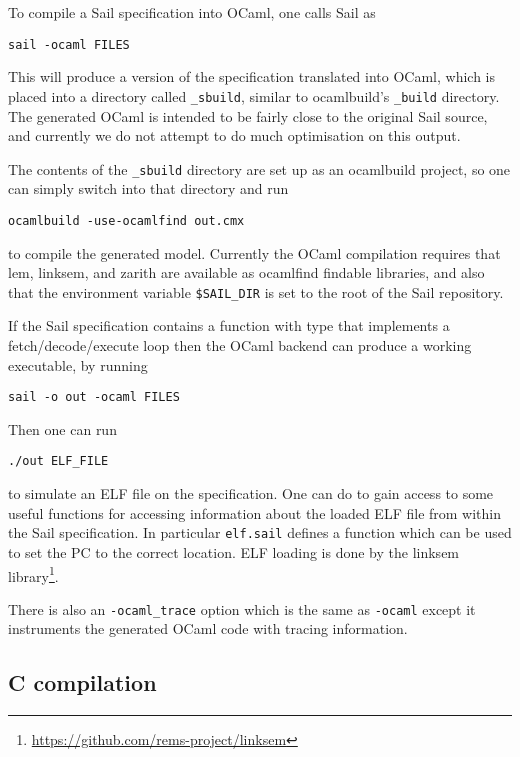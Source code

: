 To compile a Sail specification into OCaml, one calls Sail as
\begin{verbatim}
sail -ocaml FILES
\end{verbatim}
This will produce a version of the specification translated into
OCaml, which is placed into a directory called \verb+_sbuild+, similar
to ocamlbuild's \verb+_build+ directory. The generated OCaml is
intended to be fairly close to the original Sail source, and currently
we do not attempt to do much optimisation on this output.

The contents of the \verb+_sbuild+ directory are set up as an
ocamlbuild project, so one can simply switch into that directory and run
\begin{verbatim}
ocamlbuild -use-ocamlfind out.cmx
\end{verbatim}
to compile the generated model. Currently the OCaml compilation
requires that lem, linksem, and zarith are available as ocamlfind
findable libraries, and also that the environment variable
\verb+$SAIL_DIR+ is set to the root of the Sail repository.

If the Sail specification contains a  function with type
 that implements a fetch/decode/execute loop then the
OCaml backend can produce a working executable, by running
\begin{verbatim}
sail -o out -ocaml FILES
\end{verbatim}
Then one can run
\begin{verbatim}
./out ELF_FILE
\end{verbatim}
to simulate an ELF file on the specification. One can do  to gain access to some useful functions for accessing
information about the loaded ELF file from within the Sail
specification. In particular \verb+elf.sail+ defines a function
 which can be used to set the PC to the
correct location. ELF loading is done by the linksem
library\footnote{\url{https://github.com/rems-project/linksem}}.

There is also an \verb+-ocaml_trace+ option which is the same as
\verb+-ocaml+ except it instruments the generated OCaml code with
tracing information.

\subsection{C compilation}

